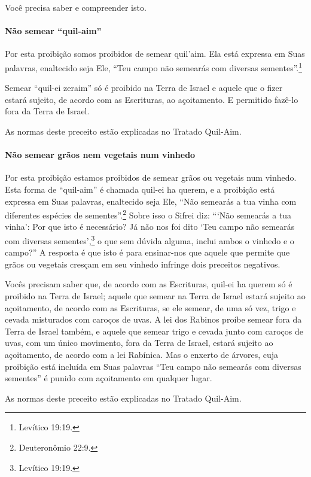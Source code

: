 Você precisa saber e compreender isto.

\paragraph{Não semear ``quil-aim''}

Por esta proibição somos proibidos de semear
quil'aim.\starr{} Ela está expressa em Suas palavras,
enaltecido seja Ele, ``Teu campo não semearás com diversas sementes''.\footnote{Levítico 19:19.}

Semear ``quil-ei zeraim'' só é proibido na Terra de Israel e aquele que
o fizer estará sujeito, de acordo com as Escrituras, ao açoitamento. E
permitido fazê-lo fora da Terra de Israel.

As normas deste preceito estão explicadas no Tratado Quil-Aim.

\paragraph{Não semear grãos nem vegetais num vinhedo}

Por esta proibição estamos proibidos de semear grãos ou vegetais num
vinhedo. Esta forma de ``quil-aim'' é chamada quil-ei ha querem, e a
proibição está expressa em Suas palavras, enaltecido seja Ele, ``Não
semearás a tua vinha com diferentes espécies de sementes''.\footnote{Deuteronômio
22:9.} Sobre isso o Sifrei diz: ```Não semearás a tua vinha': Por que
isto é necessário? Já não nos foi dito `Teu campo não semearás com
diversas sementes',\footnote{Levítico 19:19.} o que sem dúvida alguma, inclui
ambos o vinhedo e o campo?'' A resposta é que isto é para ensinar-nos
que aquele que permite que grãos ou vegetais cresçam em seu vinhedo
infringe dois preceitos negativos.

Vocês precisam saber que, de acordo com as Escrituras, quil-ei ha
querem só é proibido na Terra de Israel; aquele que semear na Terra de
Israel estará sujeito ao açoitamento, de acordo com as Escrituras, se
ele semear, de uma só vez, trigo e cevada misturados com caroços de
uvas. A lei dos Rabinos proíbe semear fora da Terra de Israel também, e
aquele que semear trigo e cevada junto com caroços de uvas, com um
único movimento, fora da Terra de Israel, estará sujeito ao açoitamento,
de acordo com a lei Rabínica. Mas o enxerto de árvores, cuja proibição
está incluída em Suas palavras ``Teu campo não semearás com diversas
sementes'' é punido com açoitamento em qualquer lugar.

As normas deste preceito estão explicadas no Tratado Quil-Aim.

